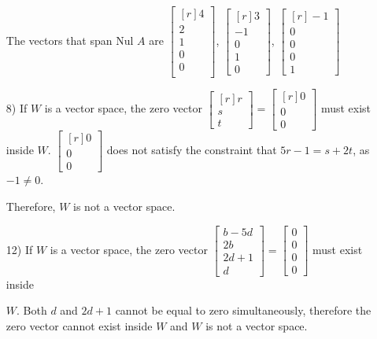 \documentclass{article}
\begin{document}
\begin{enumerate}
      The vectors that span Nul $A$ are $\begin{bmatrix*}[r]
      4\\2\\1\\0\\0\\\end{bmatrix*}$, $\begin{bmatrix*}[r]
      3\\-1\\0\\1\\0\end{bmatrix*}$, $\begin{bmatrix*}[r]
      -1\\0\\0\\0\\1\end{bmatrix*}$
    \item[8)]
      If $W$ is a vector space, the zero vector 
      $\begin{bmatrix*}[r]r\\s\\t\end{bmatrix*}=
      \begin{bmatrix*}[r]0\\0\\0\end{bmatrix*}$ must exist 
      inside $W$. $\begin{bmatrix*}[r]0\\0\\0\end{bmatrix*}$
      does not satisfy the constraint that 
      $5r-1=s+2t$, as $-1\neq0$. 

      Therefore, $W$ is not a 
      vector space.
    \item[12)]
      If $W$ is a vector space, the zero vector 
      $\begin{bmatrix*}b-5d\\2b\\2d+1\\d\end{bmatrix*}=
      \begin{bmatrix*}0\\0\\0\\0\end{bmatrix*}$ must exist
      inside 

      $W$. Both $d$ and $2d+1$ cannot be equal to zero 
      simultaneously, therefore the zero vector cannot exist
      inside $W$ and $W$ is not a vector space.

  \end{enumerate}
  
\end{document}

